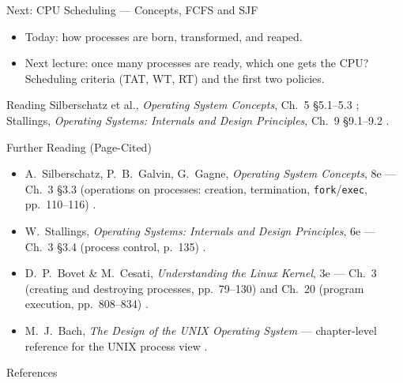\documentclass[aspectratio=169]{beamer}
\begin{document}
\begin{frame}{Next: CPU Scheduling --- Concepts, FCFS and SJF}
  \begin{itemize}
    \item Today: how processes are born, transformed, and reaped.
    \item Next lecture: once many processes are ready, which one gets the
      CPU? Scheduling criteria (TAT, WT, RT) and the first two policies.
  \end{itemize}
  \vspace{0.3cm}
  \begin{block}{Reading}
    Silberschatz et al., \emph{Operating System Concepts}, Ch.~5
    \S5.1--5.3 \cite{SilberschatzOSC_operating_system_concepts}; Stallings,
    \emph{Operating Systems: Internals and Design Principles}, Ch.~9
    \S9.1--9.2 \cite{StallingsOS_internals_design_principles}.
  \end{block}
\end{frame}

\begin{frame}{Further Reading (Page-Cited)}
  \footnotesize
  \begin{itemize}
    \item A.~Silberschatz, P.~B.~Galvin, G.~Gagne, \emph{Operating System
      Concepts}, 8e --- Ch.~3 \S3.3 (operations on processes: creation,
      termination, \texttt{fork}/\texttt{exec}, pp.~110--116)
      \cite{SilberschatzOSC_operating_system_concepts}.
    \item W.~Stallings, \emph{Operating Systems: Internals and Design
      Principles}, 6e --- Ch.~3 \S3.4 (process control, p.~135)
      \cite{StallingsOS_internals_design_principles}.
    \item D.~P.~Bovet \& M.~Cesati, \emph{Understanding the Linux Kernel}, 3e
      --- Ch.~3 (creating and destroying processes, pp.~79--130) and Ch.~20
      (program execution, pp.~808--834)
      \cite{BovetCesati_understanding_linux_kernel}.
    \item M.~J.~Bach, \emph{The Design of the UNIX Operating System} ---
      chapter-level reference for the UNIX process view
      \cite{Bach1986_design_unix_operating_system}.
  \end{itemize}
  \vspace{0.2cm}
\end{frame}

\begin{frame}[allowframebreaks]{References}
  \footnotesize
  
  
\end{frame}
\end{document}
